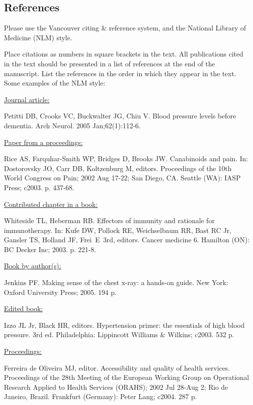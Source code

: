 \documentclass{IOS-Book-Article}
\begin{document}
\subsection{References}

Please use the Vancouver citing \& reference system, and the National Library of 
Medicine (NLM) style.

Place citations as numbers in square brackets in the text. All publications cited in 
the text should be presented in a list of references at the end of the manuscript. 
List the references in the order in which they appear in the text. Some examples of 
the NLM style:

\medskip
\noindent\ul{Journal article:}\par\noindent
Petitti DB, Crooks VC, Buckwalter JG, Chiu V. Blood pressure levels before dementia. 
Arch Neurol. 2005 Jan;62(1):112-6.

\medskip
\noindent\ul{Paper from a proceedings:}\par\noindent
Rice AS, Farquhar-Smith WP, Bridges D, Brooks JW. Canabinoids and pain. In: Dostorovsky 
JO, Carr DB, Koltzenburg M, editors. Proceedings of the 10th World Congress on Pain; 
2002 Aug 17-22; San Diego, CA. Seattle (WA): IASP Press; c2003. p. 437-68.

\medskip
\noindent\ul{Contributed chapter in a book:}\par\noindent
Whiteside TL, Heberman RB. Effectors of immunity and rationale for immunotherapy. In: 
Kufe DW, Pollock RE, Weichselbaum RR, Bast RC Jr, Gansler TS, Holland JF, Frei~E~3rd, 
editors. Cancer medicine 6. Hamilton (ON): BC Decker Inc; 2003. p. 221-8.

\medskip
\noindent\ul{Book by author(s):}\par\noindent
Jenkins PF. Making sense of the chest x-ray: a hands-on guide. New York: Oxford 
University Press; 2005. 194 p.

\medskip
\noindent\ul{Edited book:}\par\noindent
Izzo JL Jr, Black HR, editors. Hypertension primer: the essentials of high blood pressure. 
3rd ed. Philadelphia: Lippincott Williams \& Wilkins; c2003. 532 p.

\medskip
\noindent\ul{Proceedings:}\par\noindent
Ferreira de Oliveira MJ, editor. Accessibility and quality of health services. Proceedings of 
the 28th Meeting of the European Working Group on Operational Research Applied to Health 
Services (ORAHS); 2002 Jul 28-Aug 2; Rio de Janeiro, Brazil. Frankfurt (Germany): Peter Lang; 
c2004. 287 p.
\end{document}
